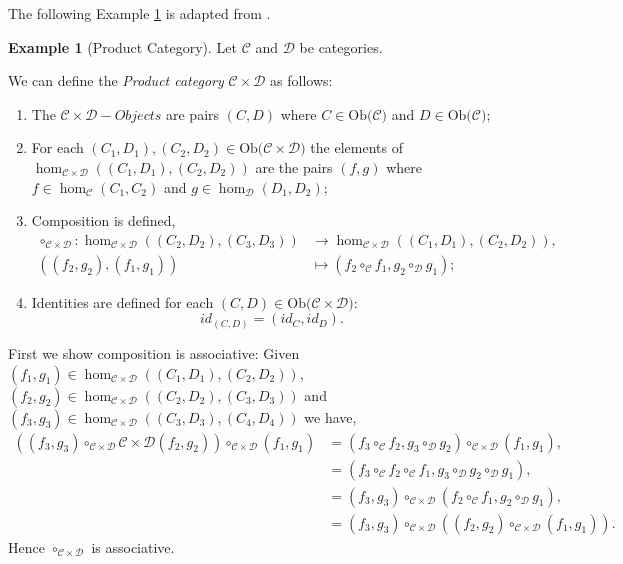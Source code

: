 \documentclass[11pt,a4paper]{article}
\theoremstyle{definition}
\newtheorem{example}[thm]{Example}
\newcommand\ho[3][]{\hom_{#1}(#2,#3)}
\newcommand\ob[1]{\mathrm{Ob(}#1\mathrm{)}}
\newcommand\cat[1]{\mathscr{#1}}
\newcommand\objs[1]{#1-Objects}
\numberwithin{equation}{section}
\begin{document}
The following Example \ref{exe:prodcat} is adapted from \cite{wiki:prodcat}.
\begin{example}[Product Category]
    \label{exe:prodcat}
    Let $\cat{C}$ and $\cat{D}$ be categories. 
    
    We can define the \emph{Product category} $\cat{C}\times\cat{D}$ as follows:
    \begin{enumerate}
        \item The $\objs{\cat{C}\times\cat{D}}$ are pairs $(C,D)$ where $C\in\ob{\cat{C}}$ and $D\in\ob{\cat{C}}$;
        \item For each $(C_{1},D_{1}),(C_{2},D_{2})\in\ob{\cat{C}\times\cat{D}}$ the elements of $\ho[\cat{C}\times\cat{D}]{(C_{1},D_{1})}{(C_{2},D_{2})}$ are the pairs $(f,g)$ where $f\in\ho[\cat{C}]{C_{1}}{C_{2}}$ and $g\in\ho[\cat{D}]{D_{1}}{D_{2}}$;
        \item Composition is defined,
        \begin{align*}
        \circ_{\cat{C}\times\cat{D}}\colon\ho[\cat{C}\times\cat{D}]{(C_{2},D_{2})}{(C_{3},D_{3})}&\to\ho[\cat{C}\times\cat{D}]{(C_{1},D_{1})}{(C_{2},D_{2})},\\
        ((f_{2},g_{2}),(f_{1},g_{1}))&\mapsto (f_{2}\circ_{\cat{C}} f_{1},g_{2}\circ_{\cat{D}}g_{1});
        \end{align*}
        \item Identities are defined for each $(C,D)\in\ob{\cat{C}\times\cat{D}}$: \[id_{(C,D)} = (id_{C},id_{D}).\]
        \end{enumerate}
        First we show composition is associative:
        Given $(f_{1},g_{1})\in\ho[\cat{C}\times\cat{D}]{(C_{1},D_{1})}{(C_{2},D_{2})}$, $(f_{2},g_{2})\in\ho[\cat{C}\times\cat{D}]{(C_{2},D_{2})}{(C_{3},D_{3})}$ and $(f_{3},g_{3})\in\ho[\cat{C}\times\cat{D}]{(C_{3},D_{3})}{(C_{4},D_{4})}$ we have,
        \begin{align*}
            ((f_{3},g_{3})\circ_{\cat{C}\times\cat{D}}\cat{C}\times\cat{D}(f_{2},g_{2}))\circ_{\cat{C}\times\cat{D}}(f_{1},g_{1})&= (f_{3}\circ_{\cat{C}} f_{2},g_{3}\circ_{\cat{D}} g_{2})\circ_{\cat{C}\times\cat{D}}(f_{1},g_{1}),\\
            &= (f_{3}\circ_{\cat{C}}f_{2}\circ_{\cat{C}}f_{1},g_{3}\circ_{\cat{D}}g_{2}\circ_{\cat{D}}g_{1}),\\
            &= (f_{3},g_{3})\circ_{\cat{C}\times\cat{D}}(f_{2}\circ_{\cat{C}}f_{1},g_{2}\circ_{\cat{D}}g_{1}),\\
            &= (f_{3},g_{3})\circ_{\cat{\cat{C}\times\cat{D}}}((f_{2},g_{2})\circ_{\cat{C}\times\cat{D}}(f_{1},g_{1})).
        \end{align*}
        Hence $\circ_{\cat{C}\times\cat{D}}$ is associative. 
        

\end{example}
\end{document}
